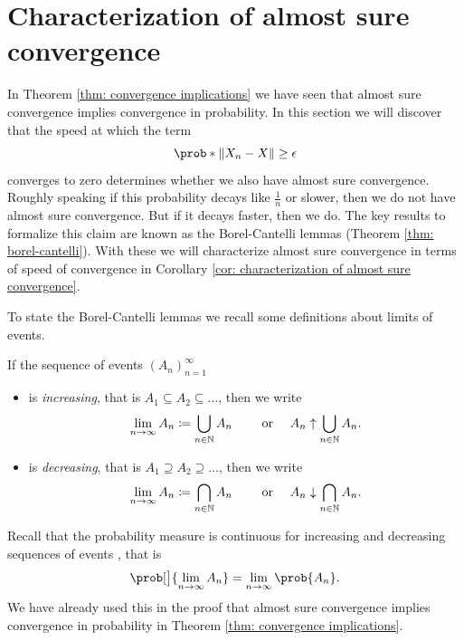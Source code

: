 \section{Characterization of almost sure convergence}
\label{sec: borel cantelli}


In Theorem \ref{thm: convergence implications} we have
seen that almost sure convergence implies convergence in probability. In this
section we will discover that the speed at which the term
\begin{equation*}
    \prob*{\norm{X_n - X} \ge \epsilon}
\end{equation*}
converges to zero determines whether we also have almost sure convergence.
Roughly speaking if this probability decays like \(\frac1n\) or slower, then
we do not have almost sure convergence. But if it decays faster, then we do.
The key results to formalize this claim are known as the Borel-Cantelli lemmas
(Theorem \ref{thm: borel-cantelli}). With these we will characterize almost sure
convergence in terms of speed of convergence in Corollary \ref{cor:
characterization of almost sure convergence}.

To state the Borel-Cantelli lemmas we recall some definitions about limits of
events.

\begin{definition}
    If the sequence of events \((A_n)_{n=1}^\infty\) 
    \begin{itemize}
        \item is \emph{increasing}, that is \(A_1\subseteq A_2\subseteq \ldots\),
        then we write
        \[
            \lim_{n\to \infty} A_n \coloneq \bigcup_{n\in \mathbb{N}} A_n
            \qquad \text{ or } \quad A_n \uparrow \bigcup_{n\in \mathbb{N}} A_n.
        \]
        \item is \emph{decreasing}, that is \(A_1\supseteq A_2\supseteq \ldots\),
        then we write
        \[
            \lim_{n\to \infty} A_n \coloneq \bigcap_{n\in \mathbb{N}} A_n
            \qquad \text{ or } \quad A_n \downarrow \bigcap_{n\in \mathbb{N}} A_n.
        \]
    \end{itemize}
\end{definition}

\begin{remark}
    \label{rem: continuity of probability}
    Recall that the probability measure is continuous for increasing and decreasing
    sequences of events \continuityOfMeasure, that is
    \begin{equation}
        \label{eq: continuity of probability}
        \prob[\big]{\lim_{n\to \infty} A_n}
        = \lim_{n\to \infty} \prob{A_n}.
    \end{equation}
    We have already used this in the proof that almost sure convergence implies
    convergence in probability in Theorem \ref{thm: convergence implications}.
\end{remark}


